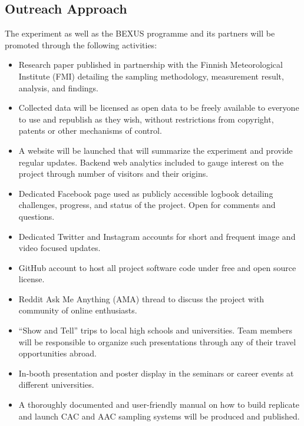 
\subsection{Outreach Approach}

The experiment as well as the BEXUS programme and its partners will be promoted through the following activities:

\begin{itemize}
\item Research paper published in partnership with the Finnish Meteorological Institute (FMI) detailing the sampling methodology, measurement result, analysis, and findings.
\item Collected data will be licensed as open data to be freely available to everyone to use and republish as they wish, without restrictions from copyright, patents or other mechanisms of control.
\item A website will be launched that will summarize the experiment and provide regular updates. Backend web analytics included to gauge interest on the project through number of visitors and their origins.
\item Dedicated Facebook page used as publicly accessible logbook detailing challenges, progress, and status of the project. Open for comments and questions.
\item Dedicated Twitter and Instagram accounts for short and frequent image and video focused updates.
\item GitHub account to host all project software code under free and open source license.
\item Reddit Ask Me Anything (AMA) thread to discuss the project with community of online enthusiasts.
\item\enquote{Show and Tell} trips to local high schools and universities. Team members will be responsible to organize such presentations through any of their travel opportunities abroad.
\item In-booth presentation and poster display in the seminars or career events at different universities. 
\item A thoroughly documented and user-friendly manual on how to build replicate and launch CAC and AAC sampling systems will be produced and published.
\end{itemize}